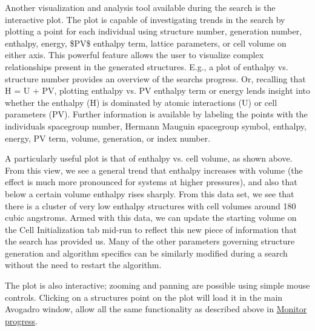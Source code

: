 Another visualization and analysis tool available during the search is the interactive plot. The plot is capable of investigating trends in the search by plotting a point for each individual using structure number, generation number, enthalpy, energy, \$\+P\+V\$ enthalpy term, lattice parameters, or cell volume on either axis. This powerful feature allows the user to visualize complex relationships present in the generated structures. E.\+g., a plot of enthalpy vs. structure number provides an overview of the search\textquotesingle{}s progress. Or, recalling that H = U + P\+V, plotting enthalpy vs. P\+V enthalpy term or energy lends insight into whether the enthalpy (H) is dominated by atomic interactions (U) or cell parameters (P\+V). Further information is available by labeling the points with the individual\textquotesingle{}s spacegroup number, Hermann Mauguin spacegroup symbol, enthalpy, energy, P\+V term, volume, generation, or index number.

A particularly useful plot is that of enthalpy vs. cell volume, as shown above. From this view, we see a general trend that enthalpy increases with volume (the effect is much more pronounced for systems at higher pressures), and also that below a certain volume enthalpy rises sharply. From this data set, we see that there is a cluster of very low enthalpy structures with cell volumes around 180 cubic angstroms. Armed with this data, we can update the starting volume on the Cell Initialization tab mid-\/run to reflect this new piece of information that the search has provided us. Many of the other parameters governing structure generation and algorithm specifics can be similarly modified during a search without the need to restart the algorithm.

The plot is also interactive; zooming and panning are possible using simple mouse controls. Clicking on a structure\textquotesingle{}s point on the plot will load it in the main Avogadro window, allow all the same functionality as described above in \hyperlink{tut-xo_prog-mon}{Monitor progress}. 